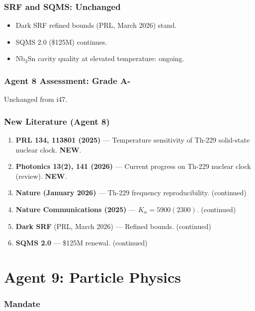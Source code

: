 \documentclass[11pt,a4paper]{article}
\newcommand{\NEW}{\textcolor{dfdblue}{\textbf{NEW}}}
\begin{document}
\section{SRF and SQMS: Unchanged}

\begin{itemize}
\item Dark SRF refined bounds (PRL, March 2026) stand.
\item SQMS 2.0 (\$125M) continues.
\item Nb$_3$Sn cavity quality at elevated temperature: ongoing.
\end{itemize}

\section{Agent 8 Assessment: Grade A-}

Unchanged from i47.

\section{New Literature (Agent 8)}

\begin{enumerate}
\item \textbf{PRL 134, 113801 (2025)} --- Temperature sensitivity of Th-229 solid-state nuclear clock. \NEW.
\item \textbf{Photonics 13(2), 141 (2026)} --- Current progress on Th-229 nuclear clock (review). \NEW.
\item \textbf{Nature (January 2026)} --- Th-229 frequency reproducibility. (continued)
\item \textbf{Nature Communications (2025)} --- $K_\alpha = 5900(2300)$. (continued)
\item \textbf{Dark SRF} (PRL, March 2026) --- Refined bounds. (continued)
\item \textbf{SQMS 2.0} --- \$125M renewal. (continued)
\end{enumerate}


\part{Agent 9: Particle Physics}
\label{part:agent9}

\section{Mandate}
\end{document}
